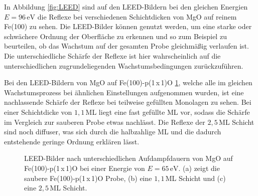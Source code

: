 In Abbildung \ref{fig:LEED} sind auf den LEED-Bildern bei den gleichen Energien $E=96\,\si{\eV}$
die Reflexe bei verschiedenen Schichtdicken von MgO auf reinem Fe(100) zu sehen. 
Die LEED-Bilder können genutzt werden, um eine starke oder schwächere Ordnung der Oberfläche zu 
erkennen und so zum Beispiel zu beurteilen, ob das Wachstum auf der gesamten Probe gleichmäßig verlaufen ist.  
Die unterschiedliche Schärfe der Reflexe ist hier wahrscheinlich auf die unterschiedlichen zugrundeliegenden Wachstumsbedingungen zurückzuführen.



Bei den LEED-Bildern von MgO auf Fe(100)-p(1\,x\,1)O \ref{fig:LEED1}, welche alle im gleichen Wachstumsprozess bei ähnlichen Einstellungen aufgenommen wurden,
ist eine nachlassende Schärfe der Reflexe bei teilweise gefüllten Monolagen zu sehen. 
Bei einer Schichtdicke von $1,1$\,ML liegt eine fast gefüllte ML vor, sodass die Schärfe im Vergleich zur sauberen
Probe etwas nachlässt. Die Reflexe der $2,5$\,ML Schicht sind noch diffuser, 
was sich durch die halbzahlige ML und die dadurch entstehende geringe Ordnung erklären lässt.




\begin{figure}[H]
  \centering
  \qquad
  \qquad

  \caption{LEED-Bilder nach unterschiedlichen Aufdampfdauern von MgO auf Fe(100)-p(1\,x\,1)O bei einer Energie von $E=65\,\si{\eV}$. (a) zeigt die saubere Fe(100)-p(1\,x\,1)O Probe,
          (b) eine $1,1$\,ML Schicht und (c) eine $2,5$\,ML Schicht.}%
  \label{fig:LEED1}
\end{figure}

